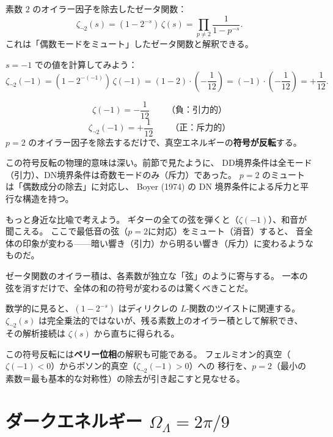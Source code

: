 \begin{dfnbox}[定義: $p=2$ ミュートゼータ]
素数 $2$ のオイラー因子を除去したゼータ関数：
\[
  \zeta_{\neg 2}(s) = (1 - 2^{-s})\,\zeta(s)
                    = \prod_{p\neq 2} \frac{1}{1-p^{-s}}.
\]
これは「偶数モードをミュート」したゼータ関数と解釈できる。
\end{dfnbox}

$s = -1$ での値を計算してみよう：
\[
  \zeta_{\neg 2}(-1) = (1 - 2^{-(-1)})\,\zeta(-1)
                     = (1 - 2)\cdot\left(-\frac{1}{12}\right)
                     = (-1)\cdot\left(-\frac{1}{12}\right)
                     = +\frac{1}{12}.
\]

\begin{keybox}[符号反転]
\[
  \zeta(-1) = -\frac{1}{12} \qquad\text{（負：引力的）}
\]
\[
  \zeta_{\neg 2}(-1) = +\frac{1}{12} \qquad\text{（正：斥力的）}
\]
$p=2$ のオイラー因子を除去するだけで、真空エネルギーの\textbf{符号が反転}する。
\end{keybox}

この符号反転の物理的意味は深い。前節で見たように、
DD境界条件は全モード（引力）、DN境界条件は奇数モードのみ（斥力）であった。
$p=2$ のミュートは「偶数成分の除去」に対応し、
Boyer (1974) の DN 境界条件による斥力と平行な構造を持つ。

\begin{hsbox}
もっと身近な比喩で考えよう。
ギターの全ての弦を弾くと（$\zeta(-1)$）、和音が聞こえる。
ここで最低音の弦（$p=2$に対応）をミュート（消音）すると、
音全体の印象が変わる——暗い響き（引力）から明るい響き（斥力）に変わるようなものだ。

ゼータ関数のオイラー積は、各素数が独立な「弦」のように寄与する。
一本の弦を消すだけで、全体の和の符号が変わるのは驚くべきことだ。
\end{hsbox}

数学的に見ると、$(1 - 2^{-s})$ はディリクレの $L$-関数のツイストに関連する。
$\zeta_{\neg 2}(s)$ は完全乗法的ではないが、残る素数上のオイラー積として解釈でき、
その解析接続は $\zeta(s)$ から直ちに得られる。

この符号反転には\textbf{ベリー位相}の解釈も可能である。
フェルミオン的真空（$\zeta(-1) < 0$）からボソン的真空（$\zeta_{\neg 2}(-1) > 0$）への
移行を、$p=2$（最小の素数＝最も基本的な対称性）の除去が引き起こすと見なせる。

\section{ダークエネルギー $\Omega_\Lambda = 2\pi/9$}
\label{sec:4.4}

